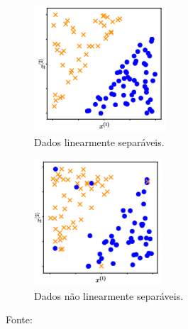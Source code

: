 \documentclass[12pt,a4paper]{scrartcl}
\theoremstyle{definition}%
\begin{document}
\begin{figure}[htbp] 
	\centering
	\begin{subfigure}[h]{0.32\textwidth}
		\centering
		\includegraphics[width=\textwidth]{dados_linearmenteseparaveismmll}
		\caption{Dados linearmente separáveis. \label{fig4:a}}
	\end{subfigure}
	\begin{subfigure}[h]{0.31\textwidth}
		\centering
		\includegraphics[width=\textwidth]{dados_nlinearmenteseparaveismml}
		\caption{Dados não linearmente separáveis. \label{fig4:b}}
	\end{subfigure}
\caption{Fonte: \textcite{Faisal2019} \label{fig4}}
\end{figure}
\end{document}
